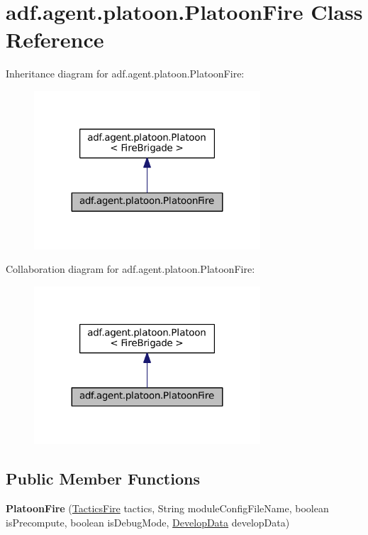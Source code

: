 \hypertarget{classadf_1_1agent_1_1platoon_1_1PlatoonFire}{}\section{adf.\+agent.\+platoon.\+Platoon\+Fire Class Reference}
\label{classadf_1_1agent_1_1platoon_1_1PlatoonFire}


Inheritance diagram for adf.\+agent.\+platoon.\+Platoon\+Fire\+:
\nopagebreak
\begin{figure}[H]
\begin{center}
\leavevmode
\includegraphics[width=239pt]{classadf_1_1agent_1_1platoon_1_1PlatoonFire__inherit__graph}
\end{center}
\end{figure}


Collaboration diagram for adf.\+agent.\+platoon.\+Platoon\+Fire\+:
\nopagebreak
\begin{figure}[H]
\begin{center}
\leavevmode
\includegraphics[width=239pt]{classadf_1_1agent_1_1platoon_1_1PlatoonFire__coll__graph}
\end{center}
\end{figure}
\subsection*{Public Member Functions}
\begin{DoxyCompactItemize}
\item 
\hypertarget{classadf_1_1agent_1_1platoon_1_1PlatoonFire_a0c1752e66c54284e31a78de7acaefe47}{}\label{classadf_1_1agent_1_1platoon_1_1PlatoonFire_a0c1752e66c54284e31a78de7acaefe47} 
{\bfseries Platoon\+Fire} (\hyperlink{classadf_1_1component_1_1tactics_1_1TacticsFire}{Tactics\+Fire} tactics, String module\+Config\+File\+Name, boolean is\+Precompute, boolean is\+Debug\+Mode, \hyperlink{classadf_1_1agent_1_1develop_1_1DevelopData}{Develop\+Data} develop\+Data)
\end{DoxyCompactItemize}

